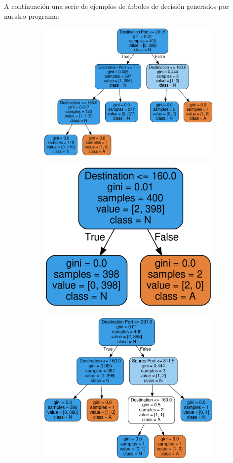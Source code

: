\documentclass[a4paper,10pt]{article}
\begin{document}
\newpage



A continuación una serie de ejemplos de árboles de decisión generados por nuestro programa:
\begin{figure}[!hbp]
\begin{subfigure}{.5\textwidth}
  \centering
  \includegraphics[width=.8\linewidth]{Wireshark/Tres/1.png}
  \caption{}
  \label{fig:sfig1}
\end{subfigure}%
\begin{subfigure}{.5\textwidth}
  \centering
  \includegraphics[width=.8\linewidth]{Wireshark/Tres/2.png}
  \caption{}
  \label{fig:sfig2}
\end{subfigure}
\begin{subfigure}{.5\textwidth}
  \centering
  \includegraphics[width=.8\linewidth]{Wireshark/Tres/3.png}

\end{subfigure}
\end{figure}
\end{document}
